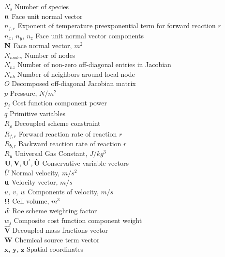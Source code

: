 \begin{nomenclature}
\begin{tabbing}
  $N_s$ \> Number of species \\
  $\mathbf{n}$ \> Face unit normal vector \\
  $n_{f,r}$ \> Exponent of temperature preexponential term for forward reaction $r$ \\
  $n_x$, $n_y$, $n_z$ \> Face unit normal vector components \\
  $\mathbf{N}$ \> Face normal vector, $m^2$ \\
  $N_{nodes}$ \> Number of nodes \\
  $N_{nz}$ \> Number of non-zero off-diagonal entries in Jacobian \\
  $N_{nb}$ \> Number of neighbors around local node \\
  $O$ \> Decomposed off-diagonal Jacobian matrix \\
  $p$ \> Pressure, $N/m^2$ \\
  $p_j$ \> Cost function component power \\
  $q$ \> Primitive variables \\
  $R_\rho$ \> Decoupled scheme constraint \\
  $R_{f,r}$ \> Forward reaction rate of reaction $r$ \\
  $R_{b,r}$ \> Backward reaction rate of reaction $r$ \\
  $R_u$ \> Universal Gas Constant, $J/kg^3$ \\
  $\mathbf U,\mathbf V, \mathbf U^{'},\mathbf{\hat{U}}$ \> Conservative variable vectors \\
  $\overline{U}$ \> Normal velocity, $m/s^2$ \\
  $\mathbf u$ \> Velocity vector, $m/s$ \\
  $u,\ v,\ w$ \> Components of velocity, $m/s$ \\
  $\Omega$ \> Cell volume, $m^3$ \\
  $\tilde{w}$ \> Roe scheme weighting factor \\
  $w_j$ \> Composite cost function component weight \\
  $\mathbf{\hat{V}}$ \>  Decoupled mass fractions vector \\
  $\mathbf{W}$ \> Chemical source term vector \\
  $\mathbf{x}$, $\mathbf{y}$, $\mathbf{z}$ \> Spatial coordinates \\
 \end{tabbing}

 \clearpage


\end{nomenclature}
